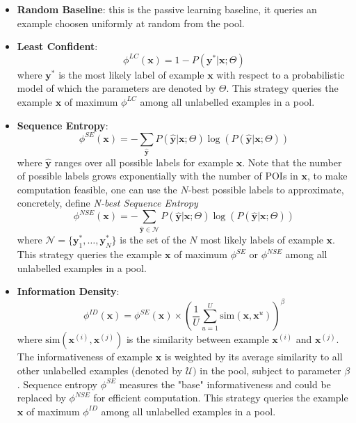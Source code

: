 \documentclass[11pt, a4paper]{article}
\begin{document}
\begin{itemize}
\item \textbf{Random Baseline}: this is the passive learning baseline,
      it queries an example choosen uniformly at random from the pool.
\item \textbf{Least Confident}\cite{settles08}: 
      \begin{equation*}
      \phi^{LC}(\textbf{x}) = 1 - P(\textbf{y}^* \vert \textbf{x}; \Theta)
      \end{equation*}
      where $\textbf{y}^*$ is the most likely label of example $\textbf{x}$ with respect to a probabilistic model 
      of which the parameters are denoted by $\Theta$.  
      This strategy queries the example $\textbf{x}$ of maximum $\phi^{LC}$ among all unlabelled examples in a pool.
\item \textbf{Sequence Entropy}\cite{settles08}:
      \begin{equation*}
      \phi^{SE}(\textbf{x}) = - \sum_{\hat{\textbf{y}}} P(\hat{\textbf{y}} \vert \textbf{x}; \Theta) 
                                \log(P(\hat{\textbf{y}} \vert \textbf{x}; \Theta))
      \end{equation*}
      where $\hat{\textbf{y}}$ ranges over all possible labels for example $\textbf{x}$.  
      Note that the number of possible labels grows exponentially with the number of POIs in $\textbf{x}$, 
      to make computation feasible, one can use the $N$-best possible labels to approximate,
      concretely, define \textit{N-best Sequence Entropy}\cite{kim06}
      \begin{equation*}
      \phi^{NSE}(\textbf{x}) = - \sum_{\hat{\textbf{y}} \in \mathcal{N}} P(\hat{\textbf{y}} \vert \textbf{x}; \Theta) 
                                 \log(P(\hat{\textbf{y}} \vert \textbf{x}; \Theta))
      \end{equation*}
      where $\mathcal{N} = \{\textbf{y}_1^*, \dots, \textbf{y}_N^*\}$ is the set of the $N$ most likely labels of example $\textbf{x}$.  
      This strategy queries the example $\textbf{x}$ of maximum $\phi^{SE}$ or $\phi^{NSE}$ among all unlabelled examples in a pool.
\item \textbf{Information Density}\cite{settles08}:
      \begin{equation*}
      \phi^{ID}(\textbf{x}) = \phi^{SE}(\textbf{x}) \times 
        \left(
        \frac{1}{U} \sum_{u=1}^U \text{sim}(\textbf{x}, \textbf{x}^u)
        \right)^\beta
      \end{equation*}
      where $\text{sim}(\textbf{x}^{(i)}, \textbf{x}^{(j)})$ is the similarity between example $\textbf{x}^{(i)}$ and $\textbf{x}^{(j)}$.
      The informativeness of example $\textbf{x}$ is weighted by its average similarity 
      to all other unlabelled examples (denoted by $\mathcal{U})$ in the pool, subject to parameter $\beta$.
      Sequence entropy $\phi^{SE}$ measures the "base" informativeness and could be replaced by $\phi^{NSE}$ for efficient computation.
      This strategy queries the example $\textbf{x}$ of maximum $\phi^{ID}$ among all unlabelled examples in a pool.
\end{itemize}
\end{document}
